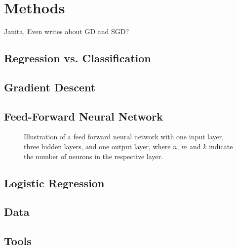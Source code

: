 \section{Methods}\label{sec:methods}
Janita, Even writes about GD and SGD?
\subsection{Regression vs. Classification}\label{ssec:regression_classification}


\subsection{Gradient Descent}\label{ssec:gradient_descent}


\subsection{Feed-Forward Neural Network}\label{ssec:ffnn}


\begin{figure}[h]
    \centering
    \resizebox{0.9\linewidth}{!}
    {}
    \caption{Illustration of a feed forward neural network with one input layer, three hidden layers, and one output layer, where $n$, $m$ and $k$ indicate the number of neurons in the respective layer.}
    \label{fig:enter-label}
\end{figure}


\subsection{Logistic Regression}\label{ssec:logreg}


\subsection{Data}\label{ssec:data}


\subsection{Tools}\label{ssec:tools}